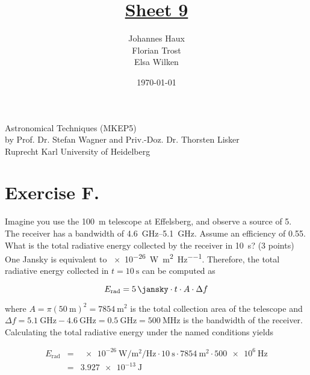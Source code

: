 \documentclass[11pt,a4paper,twoside]{article}
\title{\LARGE \underline {Sheet 9}}
\author{Johannes Haux \\ Florian Trost \\ Elsa Wilken}
\date{\today}
\begin{document}
\maketitle
\thispagestyle{empty}

\begin{center}
  Astronomical Techniques (MKEP5) \\
  \baselineskip35pt
  by Prof. Dr. Stefan Wagner and Priv.-Doz. Dr. Thorsten Lisker \\
  \baselineskip60pt
  Ruprecht Karl University of Heidelberg
\vskip 40pt

\end{center}

\newpage
\setcounter{page}{1}		%

\section*{Exercise F.} 

Imagine you use the \SI{100}{\metre} telescope at Effelsberg, and observe a source of \SI{5}{\jansky}. The receiver has a bandwidth of \SIrange{4.6}{5.1}{\GHz}. Assume an efficiency of \num{0.55}. What is the total radiative energy collected by the receiver in \SI{10}{\second}? (3 points) \\


One Jansky is equivalent to \SI{e-26}{\watt\per\metre\squared\per\hertz}. Therefore, the total radiative energy collected in $t = \SI{10}{\second}$ can be computed as

\begin{equation}
 E_{\text{rad}} = \SI{5}{\jansky} \cdot t \cdot A \cdot \Delta f
\end{equation}

where $A = \pi \left( \SI{50}{\metre} \right)^2 = \SI{7854}{\metre\squared}$ is the total collection area of the telescope and $\Delta f = \SI{5.1}{\GHz} - \SI{4.6}{\GHz} = \SI{0.5}{\GHz} = \SI{500}{\MHz}$ is the bandwidth of the receiver. \\

Calculating the total radiative energy under the named conditions yields 

\begin{eqnarray}
 E_{\text{rad}} &=& \SI{e-26}{\watt\per\metre\squared\per\hertz} \cdot \SI{10}{\second} \cdot \SI{7854}{\metre\squared} \cdot \SI{500e6}{\Hz} \\
 &=& \SI{3.927e-13}{\joule}
\end{eqnarray}
\end{document}
